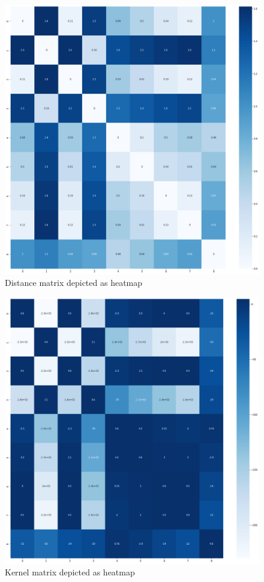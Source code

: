 	\begin{figure}
		\centering
		\includegraphics[width=12cm]{images/unordered_D.png}
		\caption{Distance matrix depicted as heatmap}
		\label{fig:unordered set K}
	\end{figure}  
	
	\begin{figure}
		\centering
		\includegraphics[width=12cm]{images/unordered_K.png}
		\caption{Kernel matrix depicted as heatmap}
		\label{fig:unordered set of K}
	\end{figure}

